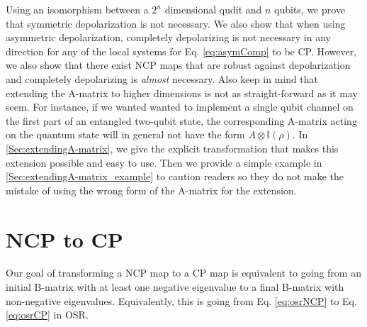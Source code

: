 \documentclass[12pt]{iopart}
\begin{document}
Using an isomorphism between a $2^n$ dimensional qudit and $n$ qubits, we prove that symmetric depolarization is not necessary. We also show that when using asymmetric depolarization, completely depolarizing is not necessary in any direction for any of the local systems for Eq. \eqref{eq:asymComp} to be CP. However, we also show that there exist NCP maps that are robust against depolarization and completely depolarizing is \textit{almost} necessary. Also keep in mind that extending the A-matrix to higher dimensions is not as straight-forward as it may seem. For instance, if we wanted wanted to implement a single qubit channel on the first part of an entangled two-qubit state, the corresponding A-matrix acting on the quantum state will in general not have the form $A \otimes \mathbb{I} (\rho)$. In \ref{Sec:extendingA-matrix}, we give the explicit transformation that makes this extension possible and easy to use. Then we provide a simple example in \ref{Sec:extendingA-matrix_example} to caution readers so they do not make the mistake of using the wrong form of the A-matrix for the extension.


\section{NCP to CP}
Our goal of transforming a NCP map to a CP map is equivalent to going from an initial B-matrix with at least one negative eigenvalue to a final B-matrix with non-negative eigenvalues. Equivalently, this is going from Eq. \eqref{eq:osrNCP} to Eq. \eqref{eq:osrCP} in OSR.
\end{document}
